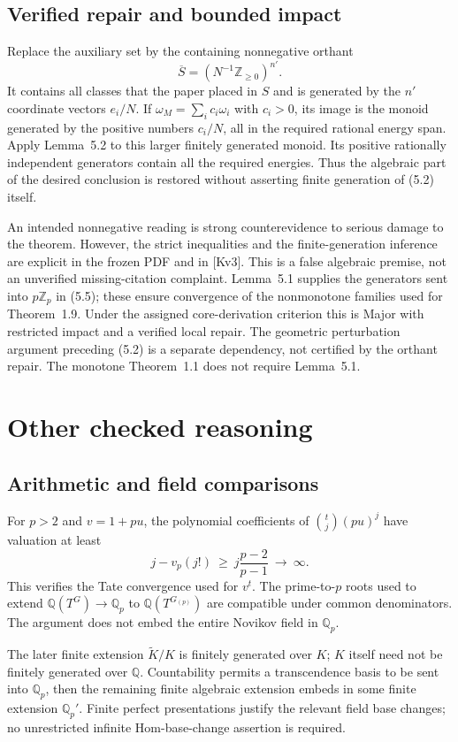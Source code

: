 \documentclass[10pt]{article}
\begin{document}
\subsection*{Verified repair and bounded impact}
Replace the auxiliary set by the containing nonnegative orthant \[\overline S=(N^{-1}\mathbb Z_{\ge0})^{n'}.\] It contains all classes that the paper placed in \(S\) and is generated by the \(n'\) coordinate vectors \(e_i/N\). If \(\omega_M=\sum_i c_i\omega_i\) with \(c_i>0\), its image is the monoid generated by the positive numbers \(c_i/N\), all in the required rational energy span. Apply Lemma 5.2 to this larger finitely generated monoid. Its positive rationally independent generators contain all the required energies. Thus the algebraic part of the desired conclusion is restored without asserting finite generation of (5.2) itself.\par
An intended nonnegative reading is strong counterevidence to serious damage to the theorem. However, the strict inequalities and the finite-generation inference are explicit in the frozen PDF and in [Kv3]. This is a false algebraic premise, not an unverified missing-citation complaint. Lemma 5.1 supplies the generators sent into \(p\mathbb Z_p\) in (5.5); these ensure convergence of the nonmonotone families used for Theorem 1.9. Under the assigned core-derivation criterion this is Major with restricted impact and a verified local repair. The geometric perturbation argument preceding (5.2) is a separate dependency, not certified by the orthant repair. The monotone Theorem 1.1 does not require Lemma 5.1.\par
\section*{Other checked reasoning}
\subsection*{Arithmetic and field comparisons}
For \(p>2\) and \(v=1+pu\), the polynomial coefficients of \(\binom{t}{j}(pu)^j\) have valuation at least \[j-v_p(j!)\ \ge\ j\frac{p-2}{p-1}\ \longrightarrow\ \infty.\] This verifies the Tate convergence used for \(v^t\). The prime-to-\(p\) roots used to extend \(\mathbb Q(T^G)\to\mathbb Q_p\) to \(\mathbb Q(T^{G_{(p)}})\) are compatible under common denominators. The argument does not embed the entire Novikov field in \(\mathbb Q_p\).\par
The later finite extension \(\widetilde K/K\) is finitely generated over \(K\); \(K\) itself need not be finitely generated over \(\mathbb Q\). Countability permits a transcendence basis to be sent into \(\mathbb Q_p\), then the remaining finite algebraic extension embeds in some finite extension \(\mathbb Q_p'\). Finite perfect presentations justify the relevant field base changes; no unrestricted infinite Hom-base-change assertion is required.\par
\end{document}
